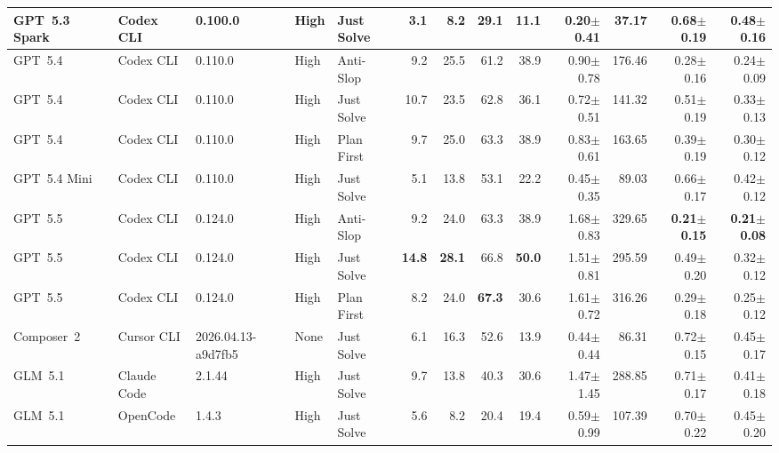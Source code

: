 \begin{table}[t]
{\begin{tabular}{l l l l l | rrrr | rr | rr}
\midrule
GPT~5.3 Spark~\citep{gpt_53_spark} & Codex CLI & 0.100.0 & High & Just Solve & 3.1 & 8.2 & 29.1 & 11.1 & \textbf{0.20{\scriptsize$\pm$0.41}} & \textbf{37.17} & 0.68{\scriptsize$\pm$0.19} & 0.48{\scriptsize$\pm$0.16} \\
\midrule
GPT~5.4~\citep{gpt_54} & Codex CLI & 0.110.0 & High & Anti-Slop & 9.2 & 25.5 & 61.2 & 38.9 & 0.90{\scriptsize$\pm$0.78} & 176.46 & 0.28{\scriptsize$\pm$0.16} & 0.24{\scriptsize$\pm$0.09} \\
GPT~5.4 & Codex CLI & 0.110.0 & High & Just Solve & 10.7 & 23.5 & 62.8 & 36.1 & 0.72{\scriptsize$\pm$0.51} & 141.32 & 0.51{\scriptsize$\pm$0.19} & 0.33{\scriptsize$\pm$0.13} \\
GPT~5.4 & Codex CLI & 0.110.0 & High & Plan First & 9.7 & 25.0 & 63.3 & 38.9 & 0.83{\scriptsize$\pm$0.61} & 163.65 & 0.39{\scriptsize$\pm$0.19} & 0.30{\scriptsize$\pm$0.12} \\
\midrule
GPT~5.4 Mini~\citep{gpt_54_mini} & Codex CLI & 0.110.0 & High & Just Solve & 5.1 & 13.8 & 53.1 & 22.2 & 0.45{\scriptsize$\pm$0.35} & 89.03 & 0.66{\scriptsize$\pm$0.17} & 0.42{\scriptsize$\pm$0.12} \\
\midrule
GPT~5.5~\citep{gpt_55} & Codex CLI & 0.124.0 & High & Anti-Slop & 9.2 & 24.0 & 63.3 & 38.9 & 1.68{\scriptsize$\pm$0.83} & 329.65 & \textbf{0.21{\scriptsize$\pm$0.15}} & \textbf{0.21{\scriptsize$\pm$0.08}} \\
GPT~5.5 & Codex CLI & 0.124.0 & High & Just Solve & \textbf{14.8} & \textbf{28.1} & 66.8 & \textbf{50.0} & 1.51{\scriptsize$\pm$0.81} & 295.59 & 0.49{\scriptsize$\pm$0.20} & 0.32{\scriptsize$\pm$0.12} \\
GPT~5.5 & Codex CLI & 0.124.0 & High & Plan First & 8.2 & 24.0 & \textbf{67.3} & 30.6 & 1.61{\scriptsize$\pm$0.72} & 316.26 & 0.29{\scriptsize$\pm$0.18} & 0.25{\scriptsize$\pm$0.12} \\
\midrule
Composer~2~\citep{composer_2} & Cursor CLI & 2026.04.13-a9d7fb5 & None & Just Solve & 6.1 & 16.3 & 52.6 & 13.9 & 0.44{\scriptsize$\pm$0.44} & 86.31 & 0.72{\scriptsize$\pm$0.15} & 0.45{\scriptsize$\pm$0.17} \\
\midrule
GLM~5.1~\citep{glm_51} & Claude Code & 2.1.44 & High & Just Solve & 9.7 & 13.8 & 40.3 & 30.6 & 1.47{\scriptsize$\pm$1.45} & 288.85 & 0.71{\scriptsize$\pm$0.17} & 0.41{\scriptsize$\pm$0.18} \\
GLM~5.1 & OpenCode & 1.4.3 & High & Just Solve & 5.6 & 8.2 & 20.4 & 19.4 & 0.59{\scriptsize$\pm$0.99} & 107.39 & 0.70{\scriptsize$\pm$0.22} & 0.45{\scriptsize$\pm$0.20} \\

\end{tabular}}
\end{table}
